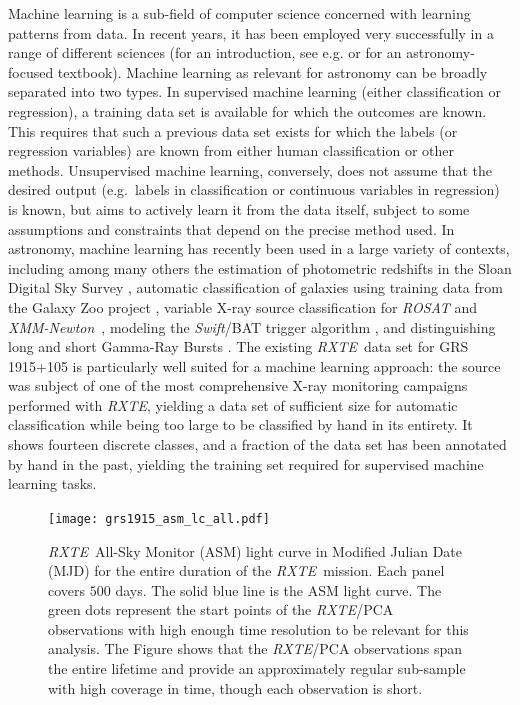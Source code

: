 \documentclass[fleqn,usenatbib]{mnras}
\newcommand{\project}[1]{\textsl{#1}}
\newcommand{\rxte}{\project{RXTE}}
\newcommand{\xmm}{\project{XMM-Newton}}
\newcommand{\rosat}{\project{ROSAT}}
\newcommand{\swift}{\project{Swift}}
\begin{document}
Machine learning is a sub-field of computer science concerned with learning patterns from data. In recent years, it has been employed very successfully in a range of different sciences (for an introduction, see e.g. \citealt{bishop2006} or \citealt{ivezic2014} for an astronomy-focused textbook). Machine learning as relevant for astronomy can be broadly separated into two types. In supervised machine learning (either classification or regression), a training data set is available for which the outcomes are known. This requires that such a previous data set exists for which the labels (or regression variables) are known from either human classification or other methods. 
Unsupervised machine learning, conversely, does not assume that the desired output (e.g.\ labels in classification or continuous variables in regression) is known, but aims to actively learn it from the data itself, subject to some assumptions and constraints that depend on the precise method used. In astronomy, machine learning has recently been used in a large variety of contexts, including among many others the estimation of photometric redshifts in the Sloan Digital Sky Survey \citep{carliles2010, beck2016}, automatic classification of galaxies using training data from the Galaxy Zoo project \citep{banerji2010, dieleman2015}, variable X-ray source classification for \rosat \citep{mcglynn2004} and \xmm\ \citep{farrell2015}, modeling the \swift/BAT trigger algorithm \citep{graff2015}, and distinguishing long and short Gamma-Ray Bursts \citep{tarnopolski2015}.
The existing \rxte\ data set for GRS 1915+105 is particularly well suited for a machine learning approach: the source was subject of one of the most comprehensive X-ray monitoring campaigns performed with \rxte, yielding a data set of sufficient size for automatic classification while being too large to be classified by hand in its entirety. It shows fourteen discrete classes, and a fraction of the data set has been annotated by hand in the past, yielding the training set required for supervised machine learning tasks.

\begin{figure}
\begin{center}
\texttt{[image: grs1915\_asm\_lc\_all.pdf]}
\caption{\rxte\ All-Sky Monitor (ASM) light curve in Modified Julian Date (MJD) for the entire duration of the \rxte\ mission. Each panel covers $500$ days. The solid blue line is the ASM light curve. The green dots represent the start points of the \rxte/PCA observations with high enough time resolution to be relevant for this analysis. The Figure shows that the \rxte/PCA observations span the entire lifetime and provide an approximately regular sub-sample with high coverage in time, though each observation is short.}
\label{fig:asm_total}
\end{center}
\end{figure}
\end{document}

